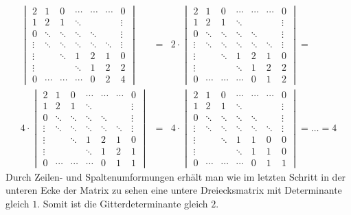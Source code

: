 \begin{eqnarray*}
\begin{vmatrix}
	2 & 1 & 0 & \cdots & \cdots & \cdots & 0 \\
	1 & 2 & 1 & \ddots &  &  & \vdots \\
	0 & \ddots & \ddots & \ddots & \ddots &  & \vdots \\
	\vdots & \ddots & \ddots & \ddots & \ddots & \ddots & \vdots \\
	\vdots & & \ddots & 1 & 2 & 1 & 0 \\
	\vdots & & & \ddots & 1 & 2 & 2 \\[0.8em] %
	0 & \cdots & \cdots & \cdots & 0 & 2 & 4
   \end{vmatrix} &=& 
 2 \cdot \begin{vmatrix}
	2 & 1 & 0 & \cdots & \cdots & \cdots & 0 \\
	1 & 2 & 1 & \ddots &  &  & \vdots \\
	0 & \ddots & \ddots & \ddots & \ddots &  & \vdots \\
	\vdots & \ddots & \ddots & \ddots & \ddots & \ddots & \vdots \\
	\vdots & & \ddots & 1 & 2 & 1 & 0 \\
	\vdots & & & \ddots & 1 & 2 & 2 \\[0.8em] %
	0 & \cdots & \cdots & \cdots & 0 & 1 & 2
   \end{vmatrix} = \\
 4 \cdot \begin{vmatrix}
	2 & 1 & 0 & \cdots & \cdots & \cdots & 0 \\
	1 & 2 & 1 & \ddots &  &  & \vdots \\
	0 & \ddots & \ddots & \ddots & \ddots &  & \vdots \\
	\vdots & \ddots & \ddots & \ddots & \ddots & \ddots & \vdots \\
	\vdots & & \ddots & 1 & 2 & 1 & 0 \\
	\vdots & & & \ddots & 1 & 2 & 1 \\[0.8em] %
	0 & \cdots & \cdots & \cdots & 0 & 1 & 1
   \end{vmatrix} &=& 4 \cdot
 \begin{vmatrix}
	2 & 1 & 0 & \cdots & \cdots & \cdots & 0 \\
	1 & 2 & 1 & \ddots &  &  & \vdots \\
	0 & \ddots & \ddots & \ddots & \ddots &  & \vdots \\
	\vdots & \ddots & \ddots & \ddots & \ddots & \ddots & \vdots \\
	\vdots & & \ddots & 1 & 1 & 0 & 0 \\
	\vdots & & & \ddots & 1 & 1 & 0 \\[0.8em] %
	0 & \cdots & \cdots & \cdots & 0 & 1 & 1
   \end{vmatrix} = \dots = 4
\end{eqnarray*}
Durch Zeilen- und Spaltenumformungen erhält man wie im letzten Schritt in der
unteren Ecke der Matrix zu sehen eine untere Dreiecksmatrix mit Determinante
gleich $1$. Somit ist die Gitterdeterminante gleich $2$.
